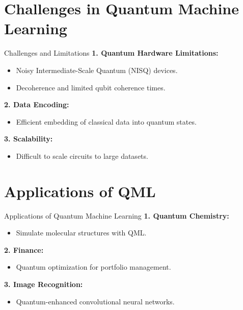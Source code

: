 \documentclass{beamer}
\begin{document}
\section{Challenges in Quantum Machine Learning}
\begin{frame}{Challenges and Limitations}
\textbf{1. Quantum Hardware Limitations:}
\begin{itemize}
    \item Noisy Intermediate-Scale Quantum (NISQ) devices.
    \item Decoherence and limited qubit coherence times.
\end{itemize}

\textbf{2. Data Encoding:}
\begin{itemize}
    \item Efficient embedding of classical data into quantum states.
\end{itemize}

\textbf{3. Scalability:}
\begin{itemize}
    \item Difficult to scale circuits to large datasets.
\end{itemize}
\end{frame}

\section{Applications of QML}
\begin{frame}{Applications of Quantum Machine Learning}
\textbf{1. Quantum Chemistry:}
\begin{itemize}
    \item Simulate molecular structures with QML.
\end{itemize}

\textbf{2. Finance:}
\begin{itemize}
    \item Quantum optimization for portfolio management.
\end{itemize}

\textbf{3. Image Recognition:}
\begin{itemize}
    \item Quantum-enhanced convolutional neural networks.
\end{itemize}
\end{frame}

\end{document}
